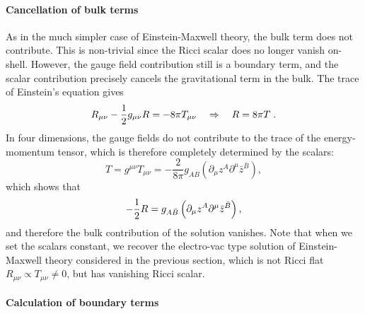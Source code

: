 \paragraph{Cancellation of bulk terms}
As in the much simpler case of Einstein-Maxwell theory, the bulk term does not contribute. This is non-trivial since the Ricci scalar does no longer vanish on-shell. However, the gauge field contribution still is a boundary term, and the scalar contribution precisely cancels the gravitational term in the bulk. The trace of Einstein's equation gives 
\begin{equation*}
    R_{\mu \nu} - \frac{1}{2} g_{\mu \nu} R = - 8\pi T_{\mu \nu} \quad  \Rightarrow \quad R = 8\pi T \;.
\end{equation*}
In four dimensions, the gauge fields do not contribute to the trace of the energy-momentum tensor, which is therefore completely determined by the scalars:
\begin{equation*}
    T = g^{\mu \nu} T_{\mu \nu} = -\frac{2}{8\pi} g_{A\bar{B}} \left(\partial_\mu z^A  \partial^\mu \bar{z}^{\bar{B}} \right) ,
\end{equation*}
which shows that
\begin{equation*}
    -\frac{1}{2} R = g_{A\bar{B}} \left(\partial_\mu z^A  \partial^\mu \bar{z}^{\bar{B}} \right) ,
\end{equation*}
and therefore the bulk contribution of the solution vanishes. Note that when we set the scalars constant, we recover the electro-vac type solution of Einstein-Maxwell theory considered in the previous section, which is not Ricci flat $R_{\mu \nu} \propto T_{\mu \nu}\not=0$, but has vanishing Ricci scalar.
 
\paragraph{Calculation of boundary terms}

